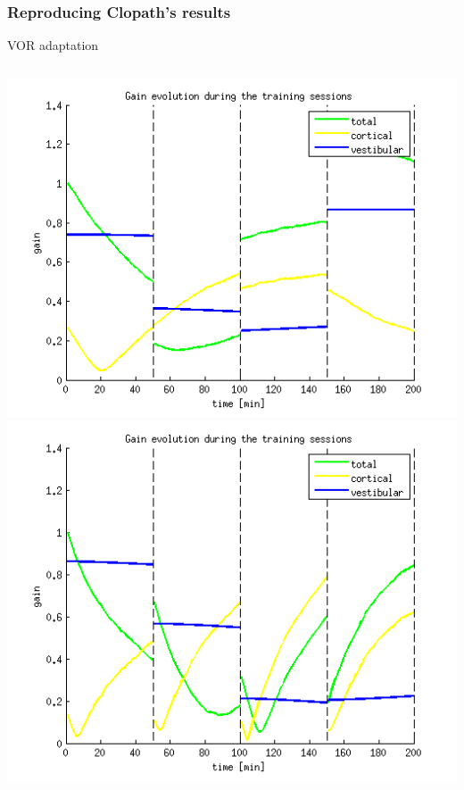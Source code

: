 \documentclass[10pt, compress]{beamer}
\begin{document}
\begin{frame}[fragile]
  \frametitle{Reproducing Clopath's results}
  VOR adaptation
  \begin{columns}[onlytextwidth]
      \includegraphics[scale=0.4]{../../simulations/parametric/html/clopath_27.png}
      \includegraphics[scale=0.4]{../../simulations/parametric/html/noidifference_54.png}
  \end{columns}
\end{frame}
\end{document}
